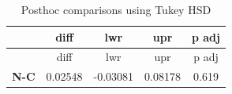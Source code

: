 \documentclass[]{article}
\begin{document}
\begin{longtable}[]{@{}ccccc@{}}
\caption{Posthoc comparisons using Tukey HSD}\tabularnewline
\toprule
\begin{minipage}[b]{0.13\columnwidth}\centering\strut
~
\strut\end{minipage} &
\begin{minipage}[b]{0.14\columnwidth}\centering\strut
diff
\strut\end{minipage} &
\begin{minipage}[b]{0.16\columnwidth}\centering\strut
lwr
\strut\end{minipage} &
\begin{minipage}[b]{0.13\columnwidth}\centering\strut
upr
\strut\end{minipage} &
\begin{minipage}[b]{0.13\columnwidth}\centering\strut
p adj
\strut\end{minipage}\tabularnewline
\midrule
\endfirsthead
\toprule
\begin{minipage}[b]{0.13\columnwidth}\centering\strut
~
\strut\end{minipage} &
\begin{minipage}[b]{0.14\columnwidth}\centering\strut
diff
\strut\end{minipage} &
\begin{minipage}[b]{0.16\columnwidth}\centering\strut
lwr
\strut\end{minipage} &
\begin{minipage}[b]{0.13\columnwidth}\centering\strut
upr
\strut\end{minipage} &
\begin{minipage}[b]{0.13\columnwidth}\centering\strut
p adj
\strut\end{minipage}\tabularnewline
\midrule
\endhead
\begin{minipage}[t]{0.13\columnwidth}\centering\strut
\textbf{N-C}
\strut\end{minipage} &
\begin{minipage}[t]{0.14\columnwidth}\centering\strut
0.02548
\strut\end{minipage} &
\begin{minipage}[t]{0.16\columnwidth}\centering\strut
-0.03081
\strut\end{minipage} &
\begin{minipage}[t]{0.13\columnwidth}\centering\strut
0.08178
\strut\end{minipage} &
\begin{minipage}[t]{0.13\columnwidth}\centering\strut
0.619
\strut\end{minipage}\tabularnewline

\end{longtable}
\end{document}
